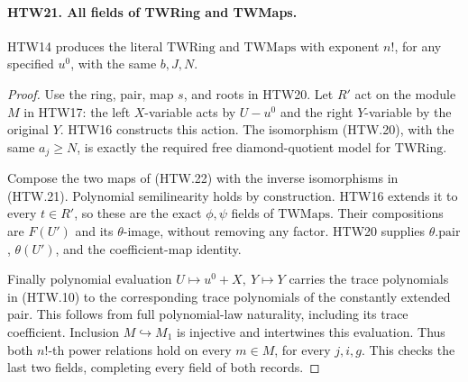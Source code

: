 \documentclass[11pt,a4paper]{article}
\numberwithin{equation}{section}
\theoremstyle{remark}\newtheorem{remark}[theorem]{Remark}
\begin{document}
\paragraph{HTW21. All fields of TWRing and TWMaps.}
\label{claim:HTW21}
HTW14 produces the literal \(\mathrm{TWRing}\)
and \(\mathrm{TWMaps}\) with exponent \(n!\), for
any specified \(u^0\), with the same \(b,J,N\).
\begin{proof}
Use the ring, pair, map \(s\), and roots in HTW20.
Let \(R'\) act on the module \(M\) in HTW17:
the left \(X\)-variable acts by \(U-u^0\) and
the right \(Y\)-variable by the original \(Y\).
HTW16 constructs this action.  The isomorphism
(HTW.20), with the same \(a_j\ge N\), is exactly
the required free diamond-quotient model for
\(\mathrm{TWRing}\).

Compose the two maps of (HTW.22) with the inverse
isomorphisms in (HTW.21).  Polynomial
semilinearity holds by construction.  HTW16
extends it to every \(t\in R'\), so these are
the exact \(\phi,\psi\) fields of \(\mathrm{TWMaps}\).
Their compositions are \(F(U')\) and its
\(\theta\)-image, without removing any factor.
HTW20 supplies \(\theta.\mathrm{pair}\),
\(\theta(U')\), and the coefficient-map identity.

Finally polynomial evaluation
\(U\mapsto u^0+X,\ Y\mapsto Y\) carries the
trace polynomials in (HTW.10) to the corresponding
trace polynomials of the constantly extended
pair.  This follows from full polynomial-law
naturality, including its trace coefficient.
Inclusion \(M\hookrightarrow M_1\) is injective
and intertwines this evaluation.  Thus both
\(n!\)-th power relations hold on every \(m\in M\),
for every \(j,i,g\).  This checks the last two
fields, completing every field of both records.
\end{proof}

\end{document}
